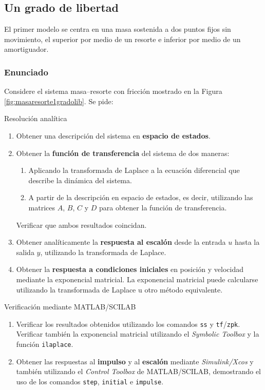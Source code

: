 \documentclass[a4paper]{article}
\begin{document}
 \subsection{Un grado de libertad}
 
 El primer modelo se centra en una masa sostenida a dos puntos fijos sin movimiento, el superior por medio de un resorte e inferior por medio de un amortiguador.
 
 \subsubsection{Enunciado}
 
 Considere el sistema masa--resorte con fricción mostrado en la Figura \ref{fig:masaresorte1gradolib}. 
 Se pide:
 
Resolución analítica
 
 \begin{enumerate}
 	\item Obtener una descripción del sistema en \textbf{espacio de estados}.
 	
 	\item Obtener la \textbf{función de transferencia} del sistema de dos maneras:
 	\begin{enumerate}
 		\item Aplicando la transformada de Laplace a la ecuación diferencial que describe la dinámica del sistema.
 		\item A partir de la descripción en espacio de estados, es decir, utilizando las matrices $A$, $B$, $C$ y $D$ para obtener la función de transferencia.
 	\end{enumerate}
 	Verificar que ambos resultados coincidan.
 	
 	\item Obtener analíticamente la \textbf{respuesta al escalón} desde la entrada $u$ hasta la salida $y$, utilizando la transformada de Laplace.
 	
 	\item Obtener la \textbf{respuesta a condiciones iniciales} en posición y velocidad mediante la exponencial matricial. 
 	La exponencial matricial puede calcularse utilizando la transformada de Laplace u otro método equivalente.
 \end{enumerate}

Verificación mediante MATLAB/SCILAB
 
 \begin{enumerate}
 	\item Verificar los resultados obtenidos utilizando los comandos \texttt{ss} y \texttt{tf}/\texttt{zpk}. 
 	Verificar también la exponencial matricial utilizando el \textit{Symbolic Toolbox} y la función \texttt{ilaplace}.
 	
 	\item Obtener las respuestas al \textbf{impulso} y al \textbf{escalón} mediante \textit{Simulink/Xcos} y también utilizando el \textit{Control Toolbox} de MATLAB/SCILAB, demostrando el uso de los comandos \texttt{step}, \texttt{initial} e \texttt{impulse}.
 \end{enumerate}
 
\end{document}
